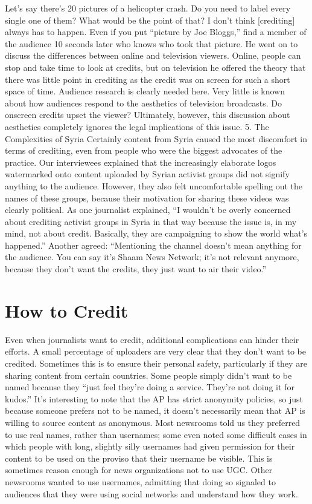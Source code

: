 \begin{enumerate}
Let's say there's 20 pictures of a helicopter crash. Do you need to label
every single one of them? What would be the point of that? I don't
think [crediting] always has to happen. Even if you put ``picture by Joe
Bloggs,'' find a member of the audience 10 seconds later who knows
who took that picture.
He went on to discuss the differences between online and television viewers.
Online, people can stop and take time to look at credits, but on television
he offered the theory that there was little point in crediting as the
credit was on screen for such a short space of time.
Audience research is clearly needed here. Very little is known about how
audiences respond to the aesthetics of television broadcasts. Do onscreen
credits upset the viewer? Ultimately, however, this discussion about aesthetics
completely ignores the legal implications of this issue.
5. The Complexities of Syria
Certainly content from Syria caused the most discomfort in terms of crediting,
even from people who were the biggest advocates of the practice. Our
interviewees explained that the increasingly elaborate logos watermarked
onto content uploaded by Syrian activist groups did not signify anything
to the audience. However, they also felt uncomfortable spelling out the
names of these groups, because their motivation for sharing these videos
was clearly political.
As one journalist explained, ``I wouldn't be overly concerned about crediting
activist groups in Syria in that way because the issue is, in my mind,
not about credit. Basically, they are campaigning to show the world
what's happened.''
Another agreed: ``Mentioning the channel doesn't mean anything for the
audience. You can say it's Shaam News Network; it's not relevant anymore,
because they don't want the credits, they just want to air their video.''

\section{How to Credit}
Even when journalists want to credit, additional complications can hinder
their efforts. A small percentage of uploaders are very clear that they don't
want to be credited. Sometimes this is to ensure their personal safety, particularly
if they are sharing content from certain countries. Some people simply
didn't want to be named because they ``just feel they're doing a service.
They're not doing it for kudos.'' It's interesting to note that the AP has strict
anonymity policies, so just because someone prefers not to be named, it
doesn't necessarily mean that AP is willing to source content as anonymous.
Most newsrooms told us they preferred to use real names, rather than usernames;
some even noted some difficult cases in which people with long,
slightly silly usernames had given permission for their content to be used on
the proviso that their username be visible. This is sometimes reason enough
for news organizations not to use UGC. Other newsrooms wanted to use
usernames, admitting that doing so signaled to audiences that they were
using social networks and understand how they work.

\end{enumerate}
